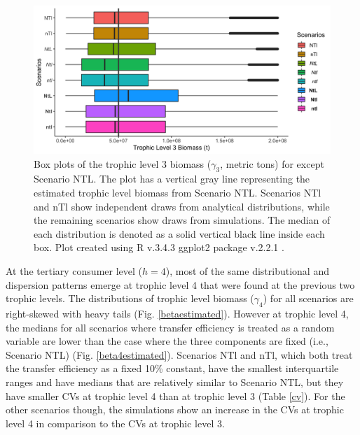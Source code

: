 \documentclass[oneside,12pt,final]{sty/ucthesis-CA2012}
\let\cite\citep                             %
\begin{document}
\begin{mainmatter}
\begin{figure}[H]
     \centering
       \includegraphics[width=1\textwidth]{fig/biomass3_box.png}
    \caption{Box plots of the trophic level 3 biomass ($\gamma_3$, metric tons) for except Scenario NTL. The plot has a vertical gray line representing the estimated trophic level biomass from Scenario NTL. Scenarios NTl and nTl show independent draws from analytical distributions, while the remaining scenarios show draws from simulations. The median of each distribution is denoted as a solid vertical black line inside each box. Plot created using R v.3.4.3 \cite{Rcite} ggplot2 package v.2.2.1 \cite{ggplot}. }
    \label{beta3estimated}
\end{figure}

At the tertiary consumer level ($h=4$), most of the same distributional and dispersion patterns emerge at trophic level 4 that were found at the previous two trophic levels. The distributions of trophic level biomass ($\gamma_4$) for all scenarios are right-skewed with heavy tails (Fig. \ref{betaestimated}). However at trophic level 4, the medians for all scenarios where transfer efficiency is treated as a random variable are lower than the case where the three components are fixed (i.e., Scenario NTL) (Fig. \ref{beta4estimated}). Scenarios NTl and nTl, which both treat the transfer efficiency as a fixed 10\% constant, have the smallest interquartile ranges and have medians that are relatively similar to Scenario NTL, but they have smaller CVs at trophic level 4 than at trophic level 3 (Table \ref{cv}). For the other scenarios though, the simulations show an increase in the CVs at trophic level 4 in comparison to the CVs at trophic level 3. 


\end{mainmatter}
\end{document}
